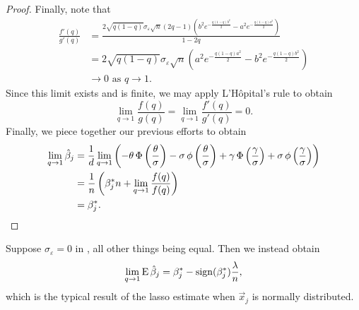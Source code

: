 \begin{proof}
  Finally, note that
  \[
    \begin{aligned}
      \frac{f'(q)}{g'(q)} & = \frac{2\sqrt{q(1-q)}\sigma_\varepsilon \sqrt{n} (2q  - 1)\left(b^2 e^{-\frac{q(1-q)b^2}{2}}- a^2 e^{-\frac{q(1-q)a^2}{2}}\right)}{1 - 2q} \\
                          & =2\sqrt{q(1-q)}\sigma_\varepsilon \sqrt{n} \left(a^2 e^{-\frac{q(1-q)a^2}{2}}- b^2 e^{-\frac{q(1-q)b^2}{2}}\right)                          \\
                          & \rightarrow 0 \text{ as } q \rightarrow 1.
    \end{aligned}
  \]
  Since this limit exists and is finite, we may apply L'Hôpital's rule to obtain
  \[
    \lim_{q \rightarrow 1} \frac{f(q)}{g(q)} = \lim_{q \rightarrow 1} \frac{f'(q)}{g'(q)} = 0.
  \]
  Finally, we piece together our previous efforts to obtain
  \[
    \begin{aligned}
      \lim_{q \rightarrow 1} \hat\beta_j & = \frac{1}{d} \lim_{q \rightarrow 1}\left(- \theta \operatorname{\Phi}\left(\frac{\theta}{\sigma}\right) - \sigma \operatorname{\phi}\left(\frac{\theta}{\sigma}\right) + \gamma \operatorname{\Phi}\left(\frac{\gamma}{\sigma}\right) + \sigma \operatorname{\phi}\left(\frac{\gamma}{\sigma}\right)\right) \\
                                         & = \frac{1}{n}\left(\beta_j^*n +  \lim_{q \rightarrow 1}\frac{f(q)}{f(q)} \right)                                                                                                                                                                 \\
                                         & = \beta_j^*.
    \end{aligned}
  \]
\end{proof}

\begin{corollary}
  Suppose \(\sigma_\varepsilon = 0\) in , all other things being equal. Then we instead obtain
  \[
    \lim_{q \rightarrow 1} \operatorname{E} \hat{\beta}_j = \beta^*_j - \operatorname{sign}(\beta^*_j)\frac{\lambda}{n},
  \]
  which is the typical result of the lasso estimate when \(\vec{x}_j\) is normally distributed.
\end{corollary}


